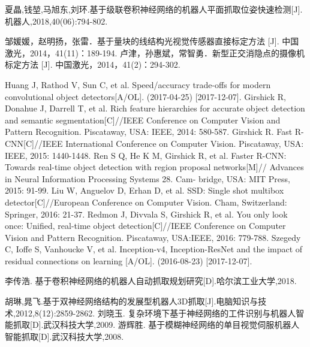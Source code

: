 \documentclass[no-math, withoutpreface]{YangThesis}
\begin{document}
\begin{thebibliography}{9}
  夏晶,钱堃,马旭东,刘环.基于级联卷积神经网络的机器人平面抓取位姿快速检测[J].机器人,2018,40(06):794-802.
 
 邹媛媛，赵明扬，张雷．基于量块的线结构光视觉传感器直接标定方法 [J]. 中国激光，2014，41(11)：189-194.
 卢津，孙惠斌，常智勇．新型正交消隐点的摄像机标定方法 [J]. 中国激光，2014，41(2)：294-302.

 Huang J, Rathod V, Sun C, et al. Speed/accuracy trade-offs for modern convolutional object detectors[A/OL]. (2017-04-25) [2017-12-07].    
 Girshick R, Donahue J, Darrell T, et al. Rich feature hierarchies for accurate object detection and semantic segmentation[C]//IEEE Conference on Computer Vision and Pattern Recognition. Piscataway, USA: IEEE, 2014: 580-587.
 Girshick R. Fast R-CNN[C]//IEEE International Conference on Computer Vision. Piscataway, USA: IEEE, 2015: 1440-1448.
 Ren S Q, He K M, Girshick R, et al. Faster R-CNN: Towards real-time object detection with region proposal networks[M]// Advances in Neural Information Processing Systems 28. Cam- bridge, USA: MIT Press, 2015: 91-99.
 Liu W, Anguelov D, Erhan D, et al. SSD: Single shot multibox detector[C]//European Conference on Computer Vision. Cham, Switzerland: Springer, 2016: 21-37.
 Redmon J, Divvala S, Girshick R, et al. You only look once: Unified, real-time object detection[C]//IEEE Conference on Computer Vision and Pattern Recognition. Piscataway, USA:IEEE, 2016: 779-788.
 Szegedy C, Ioffe S, Vanhoucke V, et al. Inception-v4, Inception-ResNet and the impact of residual connections on learning [A/OL]. (2016-08-23) [2017-12-07].

 李传浩. 基于卷积神经网络的机器人自动抓取规划研究[D].哈尔滨工业大学,2018.
 
  胡琳,晁飞.基于双神经网络结构的发展型机器人3D抓取[J].电脑知识与技术,2012,8(12):2859-2862.
 刘晓玉. 复杂环境下基于神经网络的工件识别与机器人智能抓取[D].武汉科技大学,2009.
 游辉胜. 基于模糊神经网络的单目视觉伺服机器人智能抓取[D].武汉科技大学,2008.
\end{thebibliography}
\end{document}
